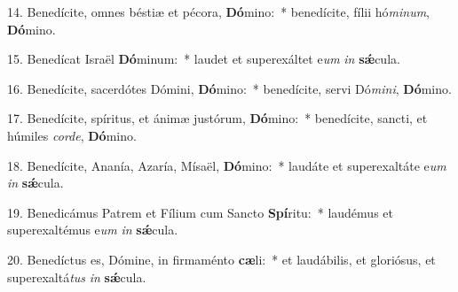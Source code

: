 14. Benedícite, omnes béstiæ et pécora, \textbf{Dó}mino:~* benedícite, fílii hó\textit{mi}\textit{num}, \textbf{Dó}mino.

15. Benedícat Israël \textbf{Dó}minum:~* laudet et superexáltet e\textit{um} \textit{in} \textbf{s\'{\ae}}cula.

16. Benedícite, sacerdótes Dómini, \textbf{Dó}mino:~* benedícite, servi Dó\textit{mi}\textit{ni}, \textbf{Dó}mino.

17. Benedícite, spíritus, et ánimæ justórum, \textbf{Dó}mino:~* benedícite, sancti, et húmiles \textit{cor}\textit{de}, \textbf{Dó}mino.

18. Benedícite, Ananía, Azaría, Mísaël, \textbf{Dó}mino:~* laudáte et superexaltáte e\textit{um} \textit{in} \textbf{s\'{\ae}}cula.

19. Benedicámus Patrem et Fílium cum Sancto \textbf{Spí}ritu:~* laudémus et superexaltémus e\textit{um} \textit{in} \textbf{s\'{\ae}}cula.

20. Benedíctus es, Dómine, in firmaménto \textbf{cæ}li:~* et laudábilis, et gloriósus, et superexaltá\textit{tus} \textit{in} \textbf{s\'{\ae}}cula.